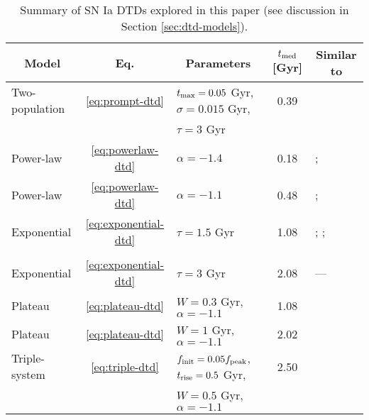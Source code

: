 \documentclass[twocolumn,twocolappendix]{aastex631}
\begin{document}
\begin{table*}
    \centering
    \caption{Summary of SN Ia DTDs explored in this paper (see discussion in Section \ref{sec:dtd-models}).}
    \label{tab:dtds}
    \begin{tabular}{lclcl}
        \hline\hline
        \multicolumn{1}{c}{Model} & Eq. & \multicolumn{1}{c}{Parameters} & $t_{\rm med}$ [Gyr] & \multicolumn{1}{c}{Similar to} \\
        \hline
        Two-population  & \ref{eq:prompt-dtd}   & $t_{\rm max}=0.05$ Gyr, $\sigma=0.015$ Gyr,   & 0.39  & \citet{Mannucci2006-TwoPopulations} \\
                        &                       & $\tau=3$ Gyr & & \\
        Power-law   & \ref{eq:powerlaw-dtd} & $\alpha=-1.4$                 & 0.18  & \citet[][cluster]{Maoz2017-CosmicDTD}; 
                                                      \citet{Heringer2019-FieldGalaxyDTD}       \\
        Power-law   & \ref{eq:powerlaw-dtd} & $\alpha=-1.1$                 & 0.48  & \citet[][field]{Maoz2017-CosmicDTD}; 
                                                      \citet{Wiseman2021-DESRates}              \\
        Exponential & \ref{eq:exponential-dtd}  & $\tau=1.5$ Gyr    & 1.08  & \citet[][SD]{Greggio2005-AnalyticalRates};
                                                                      \citet{Schonrich2009-RadialMixing};       \\
                    &                           &                   &       & \citet{Weinberg2017-ChemicalEquilibrium}  \\
        Exponential & \ref{eq:exponential-dtd}  & $\tau=3$ Gyr   & 2.08 & --- \\
        Plateau     & \ref{eq:plateau-dtd}  & $W=0.3$ Gyr, $\alpha=-1.1$    & 1.08  &\citet[][CLOSE DD]{Greggio2005-AnalyticalRates} \\
        Plateau     & \ref{eq:plateau-dtd}  & $W=1$ Gyr, $\alpha=-1.1$      & 2.02  & \citet[][WIDE DD]{Greggio2005-AnalyticalRates} \\
        Triple-system   & \ref{eq:triple-dtd}   & $f_{\rm init}=0.05f_{\rm peak}$, $t_{\rm rise}=0.5$ Gyr, & 2.50   & \citet{Rajamuthukumar2023-TripleEvolution} \\
                        &                       & $W=0.5$ Gyr, $\alpha=-1.1$ & &  \\
        \hline
    \end{tabular}
\end{table*}
\end{document}
